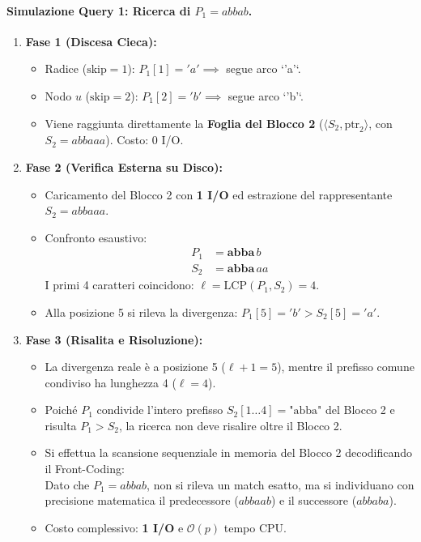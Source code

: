 \paragraph{Simulazione Query 1: Ricerca di $P_1 = abbab$.}
\begin{enumerate}
  \item \textbf{Fase 1 (Discesa Cieca):}
  \begin{itemize}
    \item Radice ($\text{skip} = 1$): $P_1[1] = 'a' \implies$ segue arco `'a'`.
    \item Nodo $u$ ($\text{skip} = 2$): $P_1[2] = 'b' \implies$ segue arco `'b'`.
    \item Viene raggiunta direttamente la \textbf{Foglia del Blocco 2} ($\langle S_2, \text{ptr}_2 \rangle$, con $S_2 = abbaaa$). Costo: $0$ I/O.
  \end{itemize}
  \item \textbf{Fase 2 (Verifica Esterna su Disco):}
  \begin{itemize}
    \item Caricamento del Blocco 2 con \textbf{1 I/O} ed estrazione del rappresentante $S_2 = abbaaa$.
    \item Confronto esaustivo:
    \begin{align*}
      P_1 &= \mathbf{abba} \, b \\
      S_2 &= \mathbf{abba} \, aa
    \end{align*}
    I primi 4 caratteri coincidono: $\ell = \text{LCP}(P_1, S_2) = 4$.
    \item Alla posizione 5 si rileva la divergenza: $P_1[5] = 'b' > S_2[5] = 'a'$.
  \end{itemize}
  \item \textbf{Fase 3 (Risalita e Risoluzione):}
  \begin{itemize}
    \item La divergenza reale \`e a posizione 5 ($\ell + 1 = 5$), mentre il prefisso comune condiviso ha lunghezza 4 ($\ell = 4$).
    \item Poich\'e $P_1$ condivide l'intero prefisso $S_2[1 \dots 4] = \text{"abba"}$ del Blocco 2 e risulta $P_1 > S_2$, la ricerca non deve risalire oltre il Blocco 2.
    \item Si effettua la scansione sequenziale in memoria del Blocco 2 decodificando il Front-Coding:
    \begin{equation}
      [abbaaa, \; abbaab, \; abbaba]
    \end{equation}
    Dato che $P_1 = abbab$, non si rileva un match esatto, ma si individuano con precisione matematica il predecessore ($abbaab$) e il successore ($abbaba$).
    \item Costo complessivo: \textbf{1 I/O} e $\mathcal{O}(p)$ tempo CPU.
  \end{itemize}
\end{enumerate}

